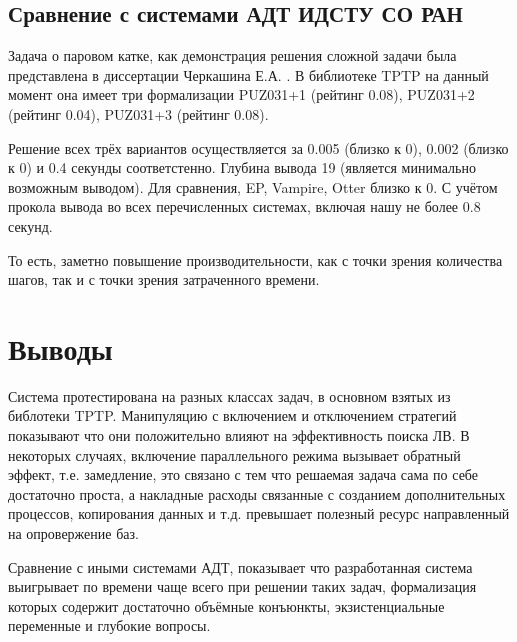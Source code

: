 \subsection{Сравнение с системами АДТ ИДСТУ СО РАН}
Задача о паровом катке, как демонстрация решения сложной задачи была представлена в диссертации Черкашина Е.А. \cite{dissChe}.
В библиотеке TPTP на данный момент она имеет три формализации PUZ031+1 (рейтинг 0.08), PUZ031+2 (рейтинг 0.04), PUZ031+3 (рейтинг 0.08).

Решение всех трёх вариантов осуществляется за 0.005 (близко к 0), 0.002 (близко к 0) и 0.4 секунды соответстенно. Глубина вывода 19 (является минимально возможным выводом). Для сравнения, EP, Vampire, Otter близко к 0. С учётом прокола вывода во всех перечисленных системах, включая нашу не более 0.8 секунд.

То есть, заметно повышение производительности, как с точки зрения количества шагов, так и с точки зрения затраченного времени.




\section{Выводы}
Система протестирована на разных классах задач, в основном взятых из библотеки TPTP. Манипуляцию с включением и отключением стратегий показывают что они положительно влияют на эффективность поиска ЛВ. В некоторых случаях, включение параллельного режима вызывает обратный эффект, т.е. замедление, это связано с тем что решаемая задача сама по себе достаточно проста, а  накладные расходы связанные с созданием дополнительных процессов, копирования данных и т.д. превышает полезный ресурс направленный на опровержение баз.

Сравнение с иными системами АДТ, показывает что разработанная система выигрывает по времени чаще всего при решении таких задач, формализация которых содержит достаточно объёмные конъюнкты, экзистенциальные переменные и глубокие вопросы.

